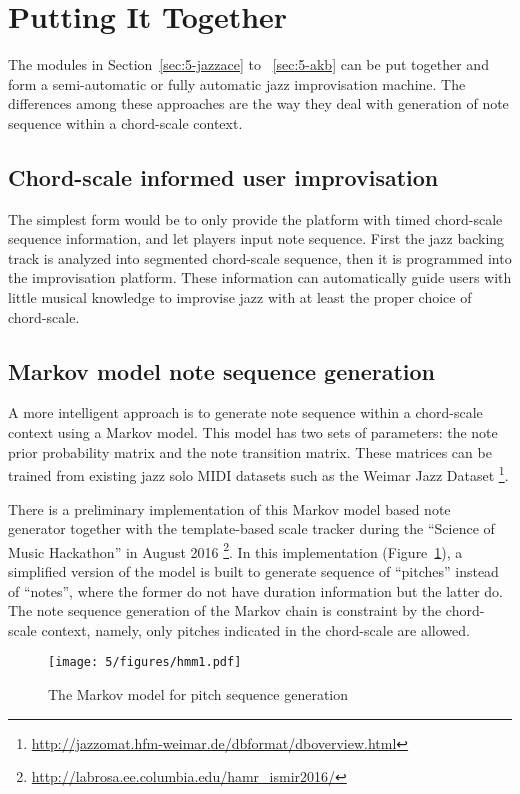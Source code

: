\section{Putting It Together}\label{sec:5-puttogether}
The modules in Section~\ref{sec:5-jazzace} to ~\ref{sec:5-akb} can be put together and form a semi-automatic or fully automatic jazz improvisation machine. The differences among these approaches are the way they deal with generation of note sequence within a chord-scale context.

\subsection{Chord-scale informed user improvisation}
The simplest form would be to only provide the platform with timed chord-scale sequence information, and let players input note sequence. First the jazz backing track is analyzed into segmented chord-scale sequence, then it is programmed into the improvisation platform. These information can automatically guide users with little musical knowledge to improvise jazz with at least the proper choice of chord-scale.

\subsection{Markov model note sequence generation}
A more intelligent approach is to generate note sequence within a chord-scale context using a Markov model. This model has two sets of parameters: the note prior probability matrix and the note transition matrix. These matrices can be trained from existing jazz solo MIDI datasets such as the Weimar Jazz Dataset \footnote{\url{http://jazzomat.hfm-weimar.de/dbformat/dboverview.html}}\cite{abesser2013introducing}.

There is a preliminary implementation of this Markov model based note generator together with the template-based scale tracker during the ``Science of Music Hackathon'' in August 2016 \footnote{\url{http://labrosa.ee.columbia.edu/hamr\_ismir2016/}}. In this implementation (Figure~\ref{fig:5-hmm1}), a simplified version of the model is built to generate sequence of ``pitches'' instead of ``notes'', where the former do not have duration information but the latter do. The note sequence generation of the Markov chain is constraint by the chord-scale context, namely, only pitches indicated in the chord-scale are allowed.

\begin{figure}[htb]
    \centering
        \texttt{[image: 5/figures/hmm1.pdf]}
    \caption{The Markov model for pitch sequence generation}
    \label{fig:5-hmm1}
\end{figure}

